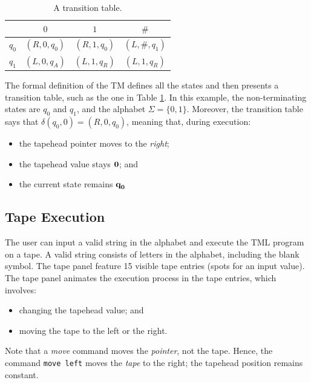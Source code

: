 \begin{table}[htb]
    \centering
    \begin{tabular}{c|ccc}
        & $0$ & $1$ & $\#$ \\
        \hline
        $q_0$ & $(R, 0, q_0)$ & $(R, 1, q_0)$ & $(L, \#, q_1)$ \\
        $q_1$ & $(L, 0, q_A)$ & $(L, 1, q_R)$ & $(L, 1, q_R)$ 
    \end{tabular}
    \caption{A transition table.}
    \label{tbl:table_isDiv2}
\end{table}

The formal definition of the TM defines all the states and then presents a transition table, such as the one in Table \ref{tbl:table_isDiv2}. In this example, the non-terminating states are $q_0$ and $q_1$, and the alphabet $\Sigma = \{0, 1\}$. Moreover, the transition table says that $\delta(q_0, 0) = (R, 0, q_0)$, meaning that, during execution:
\begin{itemize}
    \item the tapehead pointer moves to the \emph{right};
    \item the tapehead value stays $\emph{0}$; and 
    \item the current state remains $\emph{q}_\emph{0}$
\end{itemize}

\subsection{Tape Execution}
The user can input a valid string in the alphabet and execute the TML program on a tape. A valid string consists of letters in the alphabet, including the blank symbol. The tape panel feature 15 visible tape entries (spots for an input value). The tape panel animates the execution process in the tape entries, which involves:
\begin{itemize}
    \item changing the tapehead value; and
    \item moving the tape to the left or the right.
\end{itemize}
Note that a \textit{move} command moves the \textit{pointer}, not the tape. Hence, the command \texttt{move left} moves the \textit{tape} to the right; the tapehead position remains constant.

